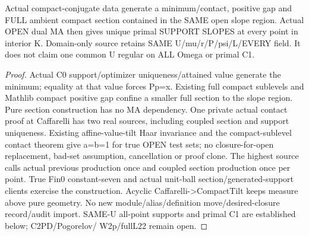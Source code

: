 \begin{lemma}
  \label{lem:contained-dual-sections}
  \leanok
  Actual compact-conjugate data generate a minimum/contact, positive gap and
  FULL ambient compact section contained in the SAME open slope region.
  Actual OPEN dual MA then gives unique primal SUPPORT SLOPES at every point
  in interior K. Domain-only source retains SAME U/mu/r/P/psi/L/EVERY field.
  It does not claim one common U regular on ALL Omega or primal C1.
\end{lemma}
\begin{proof}
  \leanok
  Actual C0 support/optimizer uniqueness/attained value generate the minimum;
  equality at that value forces Pp=x. Existing full compact sublevels and
  Mathlib compact positive gap confine a smaller full section to the slope
  region. Pure section construction has no MA dependency. One private actual
  contact proof at Caffarelli has two real sources, including coupled section
  and support uniqueness. Existing affine-value-tilt Haar invariance and the
  compact-sublevel contact theorem give a=b=1 for true OPEN test sets; no
  closure-for-open replacement, bad-set assumption, cancellation or proof
  clone. The highest source calls actual previous production once and coupled
  section production once per point. True Fin0 constant-seven and actual
  unit-ball section/generated-support clients exercise the construction.
  Acyclic Caffarelli->CompactTilt keeps measure above pure geometry. No new
  module/alias/definition move/desired-closure record/audit import. SAME-U
  all-point supports and primal C1 are established below; C2PD/Pogorelov/
  W2p/fullL22 remain open.
\end{proof}


